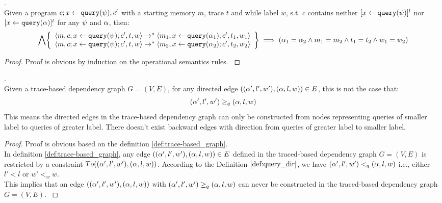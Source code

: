 \documentclass[a4paper,11pt]{article}
\begin{document}
%
%
\begin{lem}
.
\label{lem:querysemidetrm}
\\
{
Given a program $c; \mathrel{ x \leftarrow {\tt query}(\psi) }; c'$ with a starting memory $m$, trace $t$ and while label $w$, 
s.t. $c$ contains neither  
$[\mathrel{ x \leftarrow {\tt query}(\psi) }]^l$ nor $[\mathrel{ x \leftarrow {\tt query}(\alpha) }]^l$ for any $\psi$ and $\alpha$, then:
%
\[
\bigwedge
\left\{
\begin{array}{l}
\config{m, c; \assign{x}{\query(\qexpr)}; c', t, w} 
\rightarrow^{*} 
\config{m_1, \assign{x}{\query(\qval_1)}; c', t_1, w_1} 
\\
\config{m, c; \assign{x}{\query(\qexpr)}; c', t, w} 
\rightarrow^{*} 
\config{m_2, \assign{x}{\query(\qval_2)}; c', t_2, w_2} 
\end{array}
\right\}
\implies
(\qval_1 = \qval_2 \land m_1 = m_2 \land t_1 = t_2 \land w_1 = w_2)
\]
}
\end{lem}
%
\begin{proof}
{
Proof is obvious by induction on the operational semantics rules.
}
\end{proof}
%
\begin{lem}
\label{lem:edgeforwarding}
.
\\
%
{
Given a trace-based dependency graph $G = (V, E)$, 
for any directed edge $(({\alpha}',l',w'),({\alpha},l,w)) \in E$, 
this is not the case that:
%
$$({\alpha}',l',w') \geq_{q} ({\alpha},l,w)$$
%
This means the directed edges in the trace-based dependency graph can only be constructed from nodes representing queries of smaller label to queries of greater label.
There doesn't exist backward edges with direction from queries of greater label to smaller label.
}
\end{lem}
%
\begin{proof}
{
Proof is obvious based on the definition \ref{def:trace-based_graph}.
}
\\
{
In definition \ref{def:trace-based_graph},
any edge $(({\alpha}',l',w'),({\alpha},l,w)) \in E$ defined in the traced-based dependency graph $G = (V,E)$ is restricted by
a constraint
$To(({\alpha}',l',w'),({\alpha},l,w))$.
According to the Definition $\ref{def:query_dir}$, 
we have $({\alpha}',l',w') <_{q} ({\alpha},l,w)$ 
i.e., either $l' < l$ or $w' <_{w} w$.
}
\\
{
This implies that an edge $(({\alpha}',l',w'),({\alpha},l,w))$ 
with $({\alpha}',l',w') \geq_{q} ({\alpha},l,w)$ can never be constructed in the traced-based dependency graph $G = (V,E)$.
}
\end{proof}
\end{document}
